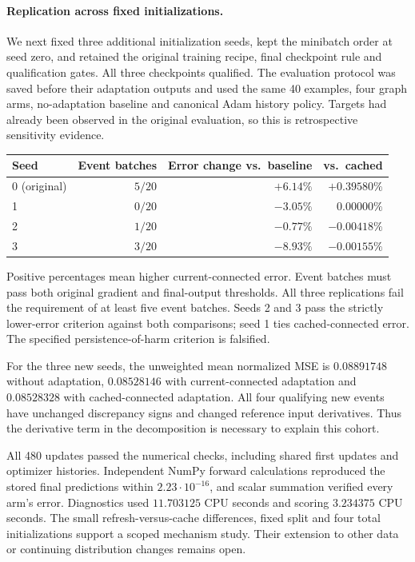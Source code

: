 \documentclass[11pt,a4paper]{article}
\begin{document}
\paragraph{Replication across fixed initializations.}
We next fixed three additional initialization seeds, kept the minibatch
order at seed zero, and retained the original training recipe, final
checkpoint rule and qualification gates. All three checkpoints qualified.
The evaluation protocol was saved before their adaptation outputs and
used the same 40 examples, four graph arms, no-adaptation baseline and
canonical Adam history policy. Targets had already been observed in the
original evaluation, so this is retrospective sensitivity evidence.

\begin{center}
\begin{tabular}{lrrr}
\hline
Seed & Event batches & Error change vs.\ baseline & vs.\ cached\\
\hline
0 (original) & $5/20$ & $+6.14\%$ & $+0.39580\%$\\
1 & $0/20$ & $-3.05\%$ & $0.00000\%$\\
2 & $1/20$ & $-0.77\%$ & $-0.00418\%$\\
3 & $3/20$ & $-8.93\%$ & $-0.00155\%$\\
\hline
\end{tabular}
\end{center}
Positive percentages mean higher current-connected error. Event batches
must pass both original gradient and final-output thresholds.
All three replications fail the requirement of at least five event
batches. Seeds 2 and 3 pass the strictly lower-error criterion against
both comparisons; seed 1 ties cached-connected error.
The specified persistence-of-harm criterion is falsified.

For the three new seeds, the unweighted mean normalized MSE is
$0.08891748$ without adaptation, $0.08528146$ with current-connected
adaptation and $0.08528328$ with cached-connected adaptation.
All four qualifying new events have unchanged discrepancy signs
and changed reference input derivatives. Thus the derivative term in
the decomposition is necessary to explain this cohort.

All 480 updates passed the numerical checks, including shared first
updates and optimizer histories. Independent NumPy forward calculations
reproduced the stored final predictions within $2.23\cdot10^{-16}$,
and scalar summation verified every arm's error. Diagnostics used
$11.703125$ CPU seconds and scoring $3.234375$ CPU seconds.
The small refresh-versus-cache differences, fixed split and four total
initializations support a scoped mechanism study. Their extension to
other data or continuing distribution changes remains open.
\end{document}
